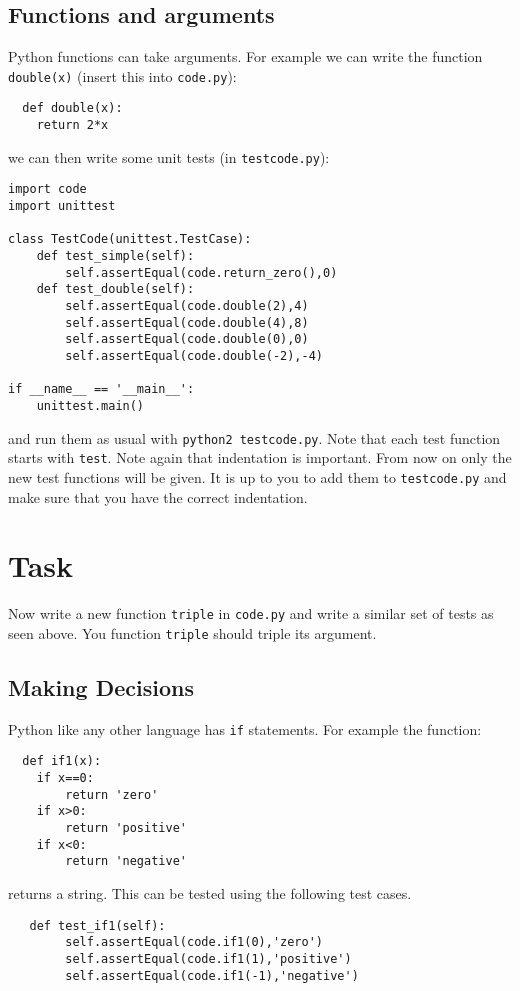 \documentclass{paper}
\begin{document}
\subsection*{Functions and arguments}
Python functions can take arguments. For example we can write the
function {\tt double(x)} (insert this into {\tt code.py}):
\begin{lstlisting}
  def double(x):
    return 2*x
\end{lstlisting}
we can then write some unit tests (in {\tt testcode.py}):
\begin{lstlisting}
import code
import unittest

class TestCode(unittest.TestCase):
    def test_simple(self):
        self.assertEqual(code.return_zero(),0)
    def test_double(self):
        self.assertEqual(code.double(2),4)
        self.assertEqual(code.double(4),8)
        self.assertEqual(code.double(0),0)
        self.assertEqual(code.double(-2),-4)

if __name__ == '__main__':
    unittest.main()

\end{lstlisting} and run them as usual with {\tt python2 testcode.py}. Note that each test function starts
with {\tt test}. Note again that indentation is important. From now on only
the new test functions will be given. It is up to you to add them to
{\tt testcode.py} and make sure that you have the correct indentation.

\section{Task}
Now write a new function {\tt triple} in {\tt code.py} and write a
similar set of tests as seen above. You function {\tt triple} should triple
its argument.

\subsection*{Making Decisions}
Python like any other language has {\tt if} statements. For example
the function:
\begin{lstlisting}
  def if1(x):
    if x==0:
        return 'zero'
    if x>0:
        return 'positive'
    if x<0:
        return 'negative'
\end{lstlisting}
returns a string. This can be tested using the following test cases.
\begin{lstlisting}
   def test_if1(self):
        self.assertEqual(code.if1(0),'zero')
        self.assertEqual(code.if1(1),'positive')
        self.assertEqual(code.if1(-1),'negative')
\end{lstlisting}
\end{document}
